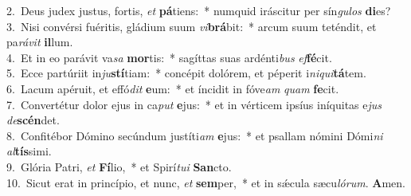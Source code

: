 {2.~}Deus judex justus, fortis, \textit{et} \textbf{pá}tiens:~* numquid iráscitur per sín\textit{gu}\textit{los} \textbf{di}es?\\
{3.~}Nisi convérsi fuéritis, gládium suum \textit{vi}\textbf{brá}bit:~* arcum suum teténdit, et pa\textit{rá}\textit{vit} \textbf{il}lum.\\
{4.~}Et in eo parávit va\textit{sa} \textbf{mor}tis:~* sagíttas suas ardénti\textit{bus} \textit{ef}\textbf{fé}cit.\\
{5.~}Ecce partúriit in\textit{ju}\textbf{stí}tiam:~* concépit dolórem, et péperit i\textit{ni}\textit{qui}\textbf{tá}tem.\\
{6.~}Lacum apéruit, et effó\textit{dit} \textbf{e}um:~* et íncidit in fóve\textit{am} \textit{quam} \textbf{fe}cit.\\
{7.~}Convertétur dolor ejus in ca\textit{put} \textbf{e}jus:~* et in vérticem ipsíus iníquitas e\textit{jus} \textit{de}\textbf{scén}det.\\
{8.~}Confitébor Dómino secúndum justíti\textit{am} \textbf{e}jus:~* et psallam nómini Dómi\textit{ni} \textit{al}\textbf{tís}simi.\\
{9.~}Glória Patri, \textit{et} \textbf{Fí}lio,~* et Spirí\textit{tu}\textit{i} \textbf{San}cto.\\
{10.~}Sicut erat in princípio, et nunc, \textit{et} \textbf{sem}per,~* et in sǽcula sæcu\textit{ló}\textit{rum}. \textbf{A}men.\\
